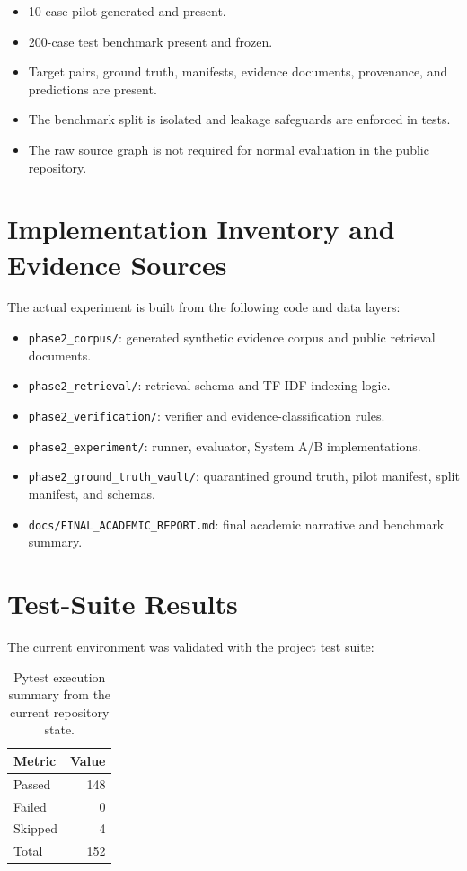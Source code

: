 \documentclass[11pt,a4paper]{article}
\begin{document}
\begin{itemize}[leftmargin=1.5em]
  \item 10-case pilot generated and present.
  \item 200-case test benchmark present and frozen.
  \item Target pairs, ground truth, manifests, evidence documents, provenance, and predictions are present.
  \item The benchmark split is isolated and leakage safeguards are enforced in tests.
  \item The raw source graph is not required for normal evaluation in the public repository.
\end{itemize}

\section{Implementation Inventory and Evidence Sources}

The actual experiment is built from the following code and data layers:

\begin{itemize}[leftmargin=1.5em]
  \item \texttt{phase2\_corpus/}: generated synthetic evidence corpus and public retrieval documents.
  \item \texttt{phase2\_retrieval/}: retrieval schema and TF-IDF indexing logic.
  \item \texttt{phase2\_verification/}: verifier and evidence-classification rules.
  \item \texttt{phase2\_experiment/}: runner, evaluator, System A/B implementations.
  \item \texttt{phase2\_ground\_truth\_vault/}: quarantined ground truth, pilot manifest, split manifest, and schemas.
  \item \texttt{docs/FINAL\_ACADEMIC\_REPORT.md}: final academic narrative and benchmark summary.
\end{itemize}

\section{Test-Suite Results}

The current environment was validated with the project test suite:

\begin{table}[h]
\centering
\begin{tabular}{l r}
\toprule
Metric & Value \\
\midrule
Passed & 148 \\
Failed & 0 \\
Skipped & 4 \\
Total & 152 \\
\bottomrule
\end{tabular}
\caption{Pytest execution summary from the current repository state.}
\end{table}
\end{document}
